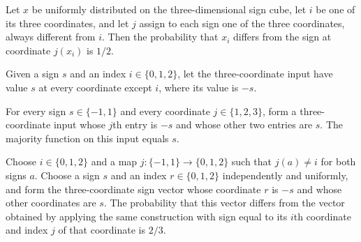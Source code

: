 \begin{theorem}
\label{FABL.expect_majorityThree_skeleton_disagreement}
\leanok
{}
Let $x$ be uniformly distributed on the three-dimensional sign cube, let $i$ be one of
its three coordinates, and let $j$ assign to each sign one of the three coordinates,
always different from $i$. Then the probability that $x_i$ differs from the sign at
coordinate $j(x_i)$ is $1/2$.
\end{theorem}

\begin{definition}
\label{FABL.majorityThreeHardInput}
\leanok
{}
Given a sign $s$ and an index $i\in\{0,1,2\}$, let the three-coordinate input have value
$s$ at every coordinate except $i$, where its value is $-s$.
\end{definition}

\begin{theorem}
\label{FABL.majority_majorityThreeHardInput}
\leanok
{}
For every sign $s\in\{-1,1\}$ and every coordinate $j\in\{1,2,3\}$, form a
three-coordinate input whose $j$th entry is $-s$ and whose other two entries are $s$.
The majority function on this input equals $s$.
\end{theorem}

\begin{theorem}
\label{FABL.expect_majorityThreeHardInput_skeleton_disagreement}
\leanok
{}
Choose $i\in\{0,1,2\}$ and a map $j:\{-1,1\}\to\{0,1,2\}$ such that $j(a)\ne i$
for both signs $a$. Choose a sign $s$ and an index $r\in\{0,1,2\}$ independently and
uniformly, and form the three-coordinate sign vector whose coordinate $r$ is $-s$ and
whose other coordinates are $s$. The probability that this vector differs from the
vector obtained by applying the same construction with sign equal to its $i$th
coordinate and index $j$ of that coordinate is $2/3$.
\end{theorem}

